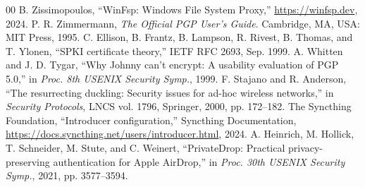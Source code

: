 \documentclass[conference]{IEEEtran}
\begin{document}
\begin{thebibliography}{00}
 B. Zissimopoulos, ``WinFsp: Windows File System Proxy,'' \url{https://winfsp.dev}, 2024.
 P. R. Zimmermann, \textit{The Official PGP User's Guide}. Cambridge, MA, USA: MIT Press, 1995.
 C. Ellison, B. Frantz, B. Lampson, R. Rivest, B. Thomas, and T. Ylonen, ``SPKI certificate theory,'' IETF RFC 2693, Sep. 1999.
 A. Whitten and J. D. Tygar, ``Why Johnny can't encrypt: A usability evaluation of PGP 5.0,'' in \textit{Proc. 8th USENIX Security Symp.}, 1999.
 F. Stajano and R. Anderson, ``The resurrecting duckling: Security issues for ad-hoc wireless networks,'' in \textit{Security Protocols}, LNCS vol. 1796, Springer, 2000, pp. 172--182.
 The Syncthing Foundation, ``Introducer configuration,'' Syncthing Documentation, \url{https://docs.syncthing.net/users/introducer.html}, 2024.
 A. Heinrich, M. Hollick, T. Schneider, M. Stute, and C. Weinert, ``PrivateDrop: Practical privacy-preserving authentication for Apple AirDrop,'' in \textit{Proc. 30th USENIX Security Symp.}, 2021, pp. 3577--3594.
\end{thebibliography}
\end{document}
